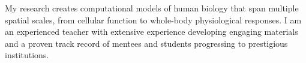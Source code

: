 \par{
My research creates computational models of human biology that span multiple spatial scales, from cellular function to whole-body physiological responses. I am an experienced teacher with extensive experience developing engaging materials and a proven track record of mentees and students progressing to prestigious institutions.
} 